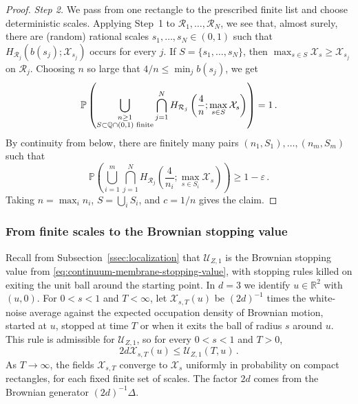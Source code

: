 \documentclass[11pt]{amsart}
\theoremstyle{plain}
\theoremstyle{definition}
\newcommand{\R}{\mathbb{R}}
\renewcommand{\P}{\mathbb{P}}
\begin{document}
\begin{proof}
\emph{Step 2.}  We pass from one rectangle to the prescribed finite list and
choose deterministic scales. Applying Step~1 to
$\mathcal R_1,\ldots,\mathcal R_N$, we see that, almost surely, there are
(random) rational scales $s_1,\ldots,s_N\in(0,1)$ such that
$H_{\mathcal R_j}(b(s_j);\mathcal X_{s_j})$ occurs for every $j$. If $S=\{s_1,\ldots,s_N\}$, then $\max_{s\in S}\mathcal X_s\geq \mathcal X_{s_j}$ on $\mathcal R_j$. Choosing $n$ so large that $4/n\leq\min_j b(s_j)$, we get
\[
    \P\left(\bigcup_{\substack{n\geq1\\ S\subset\mathbb Q\cap(0,1)\textup{ finite}}}
    \bigcap_{j=1}^N H_{\mathcal R_j}
    \left(\frac4n;\max_{s\in S}\mathcal X_s\right)
    \right)=1\, .
\]
By continuity from below, there are finitely many pairs $(n_1,S_1),\ldots,(n_m,S_m)$ such that
\[
    \P\left(\bigcup_{i=1}^m
    \bigcap_{j=1}^N H_{\mathcal R_j}
    \left(\frac4{n_i};\max_{s\in S_i}\mathcal X_s\right)
    \right)\geq1-\varepsilon\, .
\]
Taking $n=\max_i n_i$, $S=\bigcup_iS_i$, and $c=1/n$ gives the claim.
\end{proof}

\subsubsection{From finite scales to the Brownian stopping value}
\label{ssec:limiting-odometer-crossings}

Recall from Subsection~\ref{ssec:localization} that $\mathcal U_{Z,1}$ is the
Brownian stopping value from \eqref{eq:continuum-membrane-stopping-value}, with
stopping rules killed on exiting the unit ball around the starting point. In
$d=3$ we identify $u\in\R^2$ with $(u,0)$. For $0<s<1$ and $T<\infty$, let
$\mathcal X_{s,T}(u)$ be $(2d)^{-1}$ times the white-noise average against the expected
occupation density of Brownian motion, started at $u$, stopped at time $T$ or
when it exits the ball of radius $s$ around $u$. This rule is
admissible for $\mathcal U_{Z,1}$, so for every $0<s<1$ and $T>0$,
\begin{equation}\label{eq:ball-green-lower-brownian-value}
    2d \mathcal X_{s,T}(u)\leq \mathcal U_{Z,1}(T,u)\, .
\end{equation}
As $T\to\infty$, the fields $\mathcal X_{s,T}$ converge to $\mathcal X_s$ uniformly in
probability on compact rectangles, for each fixed finite set of scales. The
factor $2d$ comes from the Brownian generator $(2d)^{-1}\Delta$.
\end{document}
